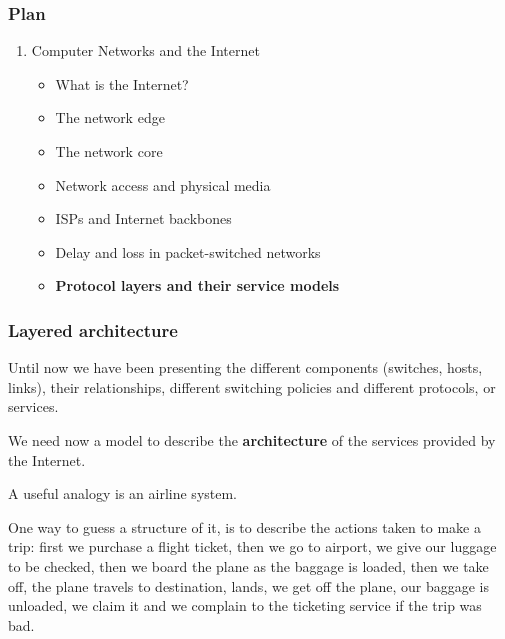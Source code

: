 
%
\begin{frame}
\frametitle{Plan}

\begin{enumerate}

  \item Computer Networks and the Internet

    \begin{itemize}

      \item What is the Internet?

      \item The network edge

      \item The network core

      \item Network access and physical media

      \item ISPs and Internet backbones

      \item Delay and loss in packet-switched networks

      \item \textbf{Protocol layers and their service models}

    \end{itemize}

\end{enumerate}

\end{frame}

%
\begin{frame}
\frametitle{Layered architecture}

Until now we have been presenting the different components (switches,
hosts, links), their relationships, different switching policies and
different protocols, or services.

\bigskip

We need now a model to describe the \textbf{architecture} of the
services provided by the Internet.

\bigskip

A useful analogy is an airline system.

\bigskip

One way to guess a structure of it, is to describe the actions taken
to make a trip: first we purchase a flight ticket, then we go to
airport, we give our luggage to be checked, then we board the plane as
the baggage is loaded, then we take off, the plane travels to
destination, lands, we get off the plane, our baggage is unloaded, we
claim it and we complain to the ticketing service if the trip was bad.

\end{frame}


